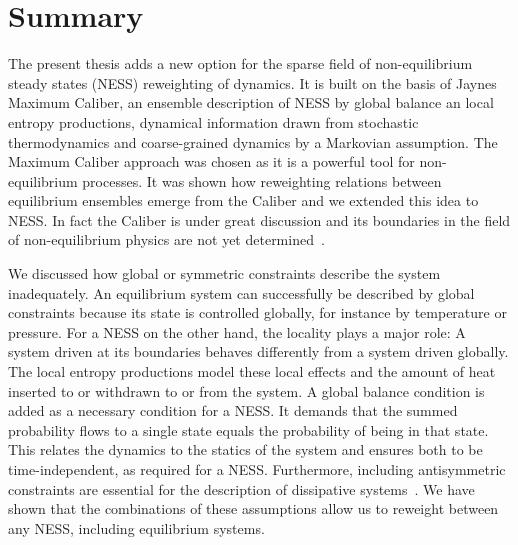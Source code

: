 % 
% 
% 
% 
% 
% 
% 

\chapter{Summary}
The present thesis adds a new option for the sparse field of non-equilibrium steady states (NESS) reweighting of dynamics. It is built on the basis of Jaynes Maximum Caliber, an ensemble description of NESS by global balance an local entropy productions, dynamical information drawn from stochastic thermodynamics and coarse-grained dynamics by a Markovian assumption. The Maximum Caliber approach was chosen as it is a powerful tool for non-equilibrium processes. It was shown how reweighting relations between equilibrium ensembles emerge from the Caliber and we extended this idea to NESS. In fact the Caliber is under great discussion and its boundaries in the field of non-equilibrium physics are not yet determined~\cite{ghosh2020maximum}. 

We discussed how global or symmetric constraints describe the system inadequately. An equilibrium system can successfully be described by global constraints because its state is controlled globally, for instance by temperature or pressure. For a NESS on the other hand, the locality plays a major role: A system driven at its boundaries behaves differently from a system driven globally. The local entropy productions model these local effects and the amount of heat inserted to or withdrawn to or from the system. A global balance condition is added as a necessary condition for a NESS. It demands that the summed probability flows to a single state equals the probability of being in that state. This relates the dynamics to the statics of the system and ensures both to be time-independent, as required for a NESS. Furthermore, including  antisymmetric constraints are essential for the description of dissipative systems~\cite{agozzino2019minimal}.  We have shown that the combinations of these assumptions allow us to reweight between any NESS, including equilibrium systems.

